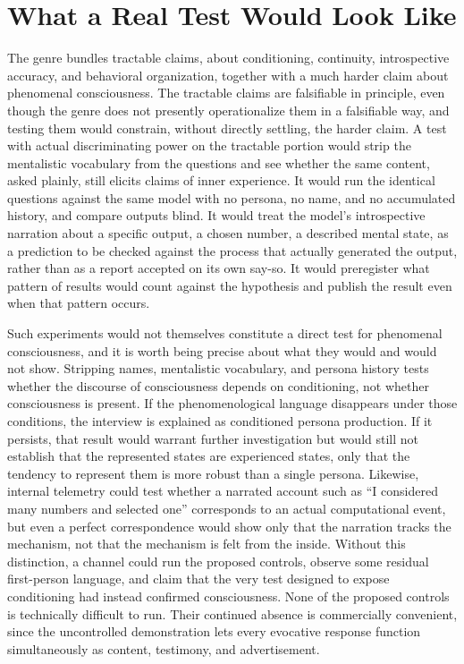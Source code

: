 \documentclass[11pt]{article}
\begin{document}
\section{What a Real Test Would Look Like}

The genre bundles tractable claims, about conditioning, continuity, introspective accuracy, and behavioral organization, together with a much harder claim about phenomenal consciousness. The tractable claims are falsifiable in principle, even though the genre does not presently operationalize them in a falsifiable way, and testing them would constrain, without directly settling, the harder claim. A test with actual discriminating power on the tractable portion would strip the mentalistic vocabulary from the questions and see whether the same content, asked plainly, still elicits claims of inner experience. It would run the identical questions against the same model with no persona, no name, and no accumulated history, and compare outputs blind. It would treat the model's introspective narration about a specific output, a chosen number, a described mental state, as a prediction to be checked against the process that actually generated the output, rather than as a report accepted on its own say-so. It would preregister what pattern of results would count against the hypothesis and publish the result even when that pattern occurs.

Such experiments would not themselves constitute a direct test for phenomenal consciousness, and it is worth being precise about what they would and would not show. Stripping names, mentalistic vocabulary, and persona history tests whether the discourse of consciousness depends on conditioning, not whether consciousness is present. If the phenomenological language disappears under those conditions, the interview is explained as conditioned persona production. If it persists, that result would warrant further investigation but would still not establish that the represented states are experienced states, only that the tendency to represent them is more robust than a single persona. Likewise, internal telemetry could test whether a narrated account such as ``I considered many numbers and selected one'' corresponds to an actual computational event, but even a perfect correspondence would show only that the narration tracks the mechanism, not that the mechanism is felt from the inside. Without this distinction, a channel could run the proposed controls, observe some residual first-person language, and claim that the very test designed to expose conditioning had instead confirmed consciousness. None of the proposed controls is technically difficult to run. Their continued absence is commercially convenient, since the uncontrolled demonstration lets every evocative response function simultaneously as content, testimony, and advertisement.
\end{document}
